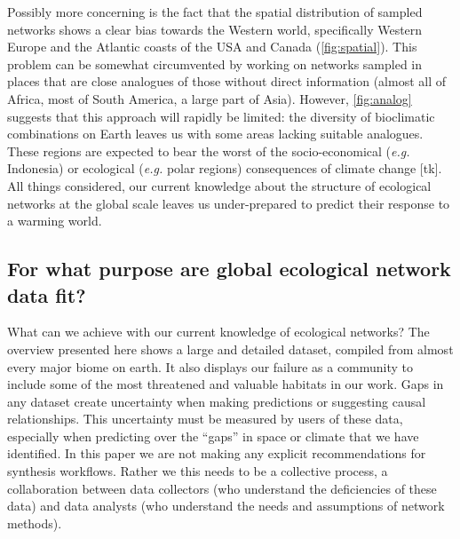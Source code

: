 Possibly more concerning is the fact that the spatial distribution of
sampled networks shows a clear bias towards the Western world,
specifically Western Europe and the Atlantic coasts of the USA and
Canada (\cref{fig:spatial}). This problem can be somewhat circumvented
by working on networks sampled in places that are close analogues of
those without direct information (almost all of Africa, most of South
America, a large part of Asia). However, \ref{fig:analog} suggests that
this approach will rapidly be limited: the diversity of bioclimatic
combinations on Earth leaves us with some areas lacking suitable
analogues. These regions are expected to bear the worst of the
socio-economical (\emph{e.g.} Indonesia) or ecological (\emph{e.g.}
polar regions) consequences of climate change {[}tk{]}. All things
considered, our current knowledge about the structure of ecological
networks at the global scale leaves us under-prepared to predict their
response to a warming world.

\hypertarget{for-what-purpose-are-global-ecological-network-data-fit}{%
\subsection{For what purpose are global ecological network data
fit?}\label{for-what-purpose-are-global-ecological-network-data-fit}}

What can we achieve with our current knowledge of ecological networks?
The overview presented here shows a large and detailed dataset, compiled
from almost every major biome on earth. It also displays our failure as
a community to include some of the most threatened and valuable habitats
in our work. Gaps in any dataset create uncertainty when making
predictions or suggesting causal relationships. This uncertainty must be
measured by users of these data, especially when predicting over the
``gaps'' in space or climate that we have identified. In this paper we
are not making any explicit recommendations for synthesis workflows.
Rather we this needs to be a collective process, a collaboration between
data collectors (who understand the deficiencies of these data) and data
analysts (who understand the needs and assumptions of network methods).

